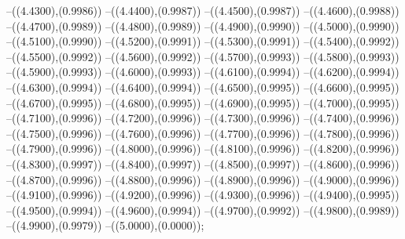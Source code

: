 {	--({\sx*(4.4300)},{\sy*(0.9986)})
	--({\sx*(4.4400)},{\sy*(0.9987)})
	--({\sx*(4.4500)},{\sy*(0.9987)})
	--({\sx*(4.4600)},{\sy*(0.9988)})
	--({\sx*(4.4700)},{\sy*(0.9989)})
	--({\sx*(4.4800)},{\sy*(0.9989)})
	--({\sx*(4.4900)},{\sy*(0.9990)})
	--({\sx*(4.5000)},{\sy*(0.9990)})
	--({\sx*(4.5100)},{\sy*(0.9990)})
	--({\sx*(4.5200)},{\sy*(0.9991)})
	--({\sx*(4.5300)},{\sy*(0.9991)})
	--({\sx*(4.5400)},{\sy*(0.9992)})
	--({\sx*(4.5500)},{\sy*(0.9992)})
	--({\sx*(4.5600)},{\sy*(0.9992)})
	--({\sx*(4.5700)},{\sy*(0.9993)})
	--({\sx*(4.5800)},{\sy*(0.9993)})
	--({\sx*(4.5900)},{\sy*(0.9993)})
	--({\sx*(4.6000)},{\sy*(0.9993)})
	--({\sx*(4.6100)},{\sy*(0.9994)})
	--({\sx*(4.6200)},{\sy*(0.9994)})
	--({\sx*(4.6300)},{\sy*(0.9994)})
	--({\sx*(4.6400)},{\sy*(0.9994)})
	--({\sx*(4.6500)},{\sy*(0.9995)})
	--({\sx*(4.6600)},{\sy*(0.9995)})
	--({\sx*(4.6700)},{\sy*(0.9995)})
	--({\sx*(4.6800)},{\sy*(0.9995)})
	--({\sx*(4.6900)},{\sy*(0.9995)})
	--({\sx*(4.7000)},{\sy*(0.9995)})
	--({\sx*(4.7100)},{\sy*(0.9996)})
	--({\sx*(4.7200)},{\sy*(0.9996)})
	--({\sx*(4.7300)},{\sy*(0.9996)})
	--({\sx*(4.7400)},{\sy*(0.9996)})
	--({\sx*(4.7500)},{\sy*(0.9996)})
	--({\sx*(4.7600)},{\sy*(0.9996)})
	--({\sx*(4.7700)},{\sy*(0.9996)})
	--({\sx*(4.7800)},{\sy*(0.9996)})
	--({\sx*(4.7900)},{\sy*(0.9996)})
	--({\sx*(4.8000)},{\sy*(0.9996)})
	--({\sx*(4.8100)},{\sy*(0.9996)})
	--({\sx*(4.8200)},{\sy*(0.9996)})
	--({\sx*(4.8300)},{\sy*(0.9997)})
	--({\sx*(4.8400)},{\sy*(0.9997)})
	--({\sx*(4.8500)},{\sy*(0.9997)})
	--({\sx*(4.8600)},{\sy*(0.9996)})
	--({\sx*(4.8700)},{\sy*(0.9996)})
	--({\sx*(4.8800)},{\sy*(0.9996)})
	--({\sx*(4.8900)},{\sy*(0.9996)})
	--({\sx*(4.9000)},{\sy*(0.9996)})
	--({\sx*(4.9100)},{\sy*(0.9996)})
	--({\sx*(4.9200)},{\sy*(0.9996)})
	--({\sx*(4.9300)},{\sy*(0.9996)})
	--({\sx*(4.9400)},{\sy*(0.9995)})
	--({\sx*(4.9500)},{\sy*(0.9994)})
	--({\sx*(4.9600)},{\sy*(0.9994)})
	--({\sx*(4.9700)},{\sy*(0.9992)})
	--({\sx*(4.9800)},{\sy*(0.9989)})
	--({\sx*(4.9900)},{\sy*(0.9979)})
	--({\sx*(5.0000)},{\sy*(0.0000)});
}
\def\xwertec{
\fill[color=red] (0.0000,0) circle[radius={0.07/\skala}];
\fill[color=red] (0.8333,0) circle[radius={0.07/\skala}];
\fill[color=red] (1.6667,0) circle[radius={0.07/\skala}];
\fill[color=red] (2.5000,0) circle[radius={0.07/\skala}];
\fill[color=red] (3.3333,0) circle[radius={0.07/\skala}];
\fill[color=red] (4.1667,0) circle[radius={0.07/\skala}];
\fill[color=red] (5.0000,0) circle[radius={0.07/\skala}];
}
\def\punktec{6}
\def\maxfehlerc{1.041\cdot 10^{-2}}
